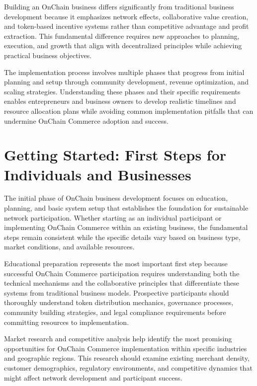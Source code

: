 \documentclass[
  Letterpaper,
]{scrbook}
\begin{document}
Building an OnChain business differs significantly from traditional
business development because it emphasizes network effects,
collaborative value creation, and token-based incentive systems rather
than competitive advantage and profit extraction. This fundamental
difference requires new approaches to planning, execution, and growth
that align with decentralized principles while achieving practical
business objectives.

The implementation process involves multiple phases that progress from
initial planning and setup through community development, revenue
optimization, and scaling strategies. Understanding these phases and
their specific requirements enables entrepreneurs and business owners to
develop realistic timelines and resource allocation plans while avoiding
common implementation pitfalls that can undermine OnChain Commerce
adoption and success.

\section{Getting Started: First Steps for Individuals and
Businesses}\label{getting-started-first-steps-for-individuals-and-businesses}

The initial phase of OnChain business development focuses on education,
planning, and basic system setup that establishes the foundation for
sustainable network participation. Whether starting as an individual
participant or implementing OnChain Commerce within an existing
business, the fundamental steps remain consistent while the specific
details vary based on business type, market conditions, and available
resources.

Educational preparation represents the most important first step because
successful OnChain Commerce participation requires understanding both
the technical mechanisms and the collaborative principles that
differentiate these systems from traditional business models.
Prospective participants should thoroughly understand token distribution
mechanics, governance processes, community building strategies, and
legal compliance requirements before committing resources to
implementation.

Market research and competitive analysis help identify the most
promising opportunities for OnChain Commerce implementation within
specific industries and geographic regions. This research should examine
existing merchant density, customer demographics, regulatory
environments, and competitive dynamics that might affect network
development and participant success.
\end{document}
